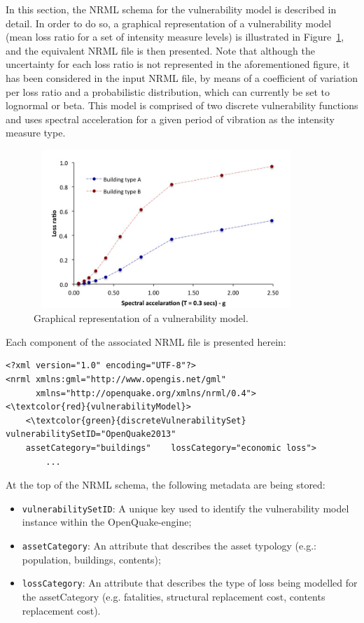 In this section, the NRML schema for the \gls{vulnerability model} is described in detail. In order to do so, a graphical representation of a \gls{vulnerability model} (mean loss ratio for a set of intensity measure levels) is illustrated in Figure~\ref{fig:vulModel}, and the equivalent NRML file is then presented. Note that although the uncertainty for each loss ratio is not represented in the aforementioned figure, it has been considered in the input NRML file, by means of a coefficient of variation per loss ratio and a probabilistic distribution, which can currently be set to lognormal or beta. This model is comprised of two discrete \glspl{vulnerability function} and uses spectral acceleration for a given period of vibration as the intensity measure type.

\begin{figure}[ht]
\centering
\includegraphics[width=10cm,height=6cm]{figures/risk/vulnerabilityModel.pdf}
\caption{Graphical representation of a vulnerability model.}
\label{fig:vulModel}
\end{figure}

Each component of the associated NRML file is presented herein:

\begin{Verbatim}[frame=single, commandchars=\\\{\}, samepage=true]
<?xml version="1.0" encoding="UTF-8"?>
<nrml xmlns:gml="http://www.opengis.net/gml"
      xmlns="http://openquake.org/xmlns/nrml/0.4">
<\textcolor{red}{vulnerabilityModel}>
    <\textcolor{green}{discreteVulnerabilitySet} vulnerabilitySetID="OpenQuake2013"	
    assetCategory="buildings"    lossCategory="economic loss">
        ...
\end{Verbatim}

At the top of the NRML schema, the following metadata are being stored:
\begin{itemize}
\item  \Verb+vulnerabilitySetID+: A unique key used to identify the \gls{vulnerability model} instance within the OpenQuake-engine;
\item  \Verb+assetCategory+: An attribute that describes the asset typology (e.g.: population, buildings, contents);
\item  \Verb+lossCategory+: An attribute that describes the type of loss being modelled for the assetCategory (e.g. fatalities, structural replacement cost, contents replacement cost).
\end{itemize}

